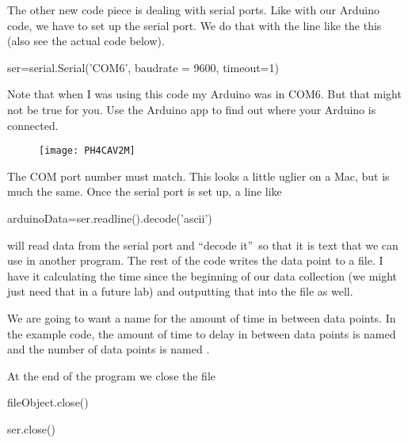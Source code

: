 The other new code piece is dealing with serial ports. Like with our Arduino
code, we have to set up the serial port. We do that with the line like the
this (also see the actual code below).
\begin{python}
	ser=serial.Serial('COM6', baudrate = 9600, timeout=1)
\end{python}
Note that when I was using this code my Arduino was in COM6. But that might
not be true for you. Use the Arduino app to find out where your Arduino is
connected. \begin{figure}[h!]
\texttt{[image: PH4CAV2M]}
\end{figure}

The COM port number must match. This looks a little uglier on a Mac, but is
much the same. Once the serial port is set up, a line like

\begin{python}
	arduinoData=ser.readline().decode('ascii')
\end{python}
will read data from the serial port and \textquotedblleft decode
it\textquotedblright\ so that it is text that we can use in another program.
The rest of the code writes the data point to a file. I have it calculating
the time since the beginning of our data collection (we might just need that
in a future lab) and outputting that into the file as well.

We are going to want a name for the amount of time in between data points.
In the example code, the amount of time to delay in between data points is
named  and the number of data points is named .

At the end of the program we close the file

\begin{python}
	fileObject.close()
\end{python}

\begin{python}
	ser.close()
\end{python}

